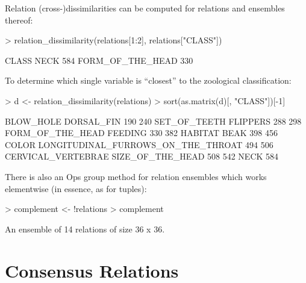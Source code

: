 \documentclass[fleqn]{article}
\newcommand{\dQuote}[1]{``{#1}''}
\begin{document}
Relation (cross-)dissimilarities can be computed for relations and
ensembles thereof:
\begin{Schunk}
\begin{Sinput}
> relation_dissimilarity(relations[1:2], relations["CLASS"])
\end{Sinput}
\begin{Soutput}
                 CLASS
NECK               584
FORM_OF_THE_HEAD   330
\end{Soutput}
\end{Schunk}
To determine which single variable is \dQuote{closest} to the zoological
classification:
\begin{Schunk}
\begin{Sinput}
> d <- relation_dissimilarity(relations)
> sort(as.matrix(d)[, "CLASS"])[-1]
\end{Sinput}
\begin{Soutput}
                         BLOW_HOLE                         DORSAL_FIN 
                               190                                240 
                      SET_OF_TEETH                           FLIPPERS 
                               288                                298 
                  FORM_OF_THE_HEAD                            FEEDING 
                               330                                382 
                           HABITAT                               BEAK 
                               398                                456 
                             COLOR LONGITUDINAL_FURROWS_ON_THE_THROAT 
                               494                                506 
                CERVICAL_VERTEBRAE                   SIZE_OF_THE_HEAD 
                               508                                542 
                              NECK 
                               584 
\end{Soutput}
\end{Schunk}

There is also an Ops group method for relation ensembles which works
elementwise (in essence, as for tuples):
\begin{Schunk}
\begin{Sinput}
> complement <- !relations
> complement
\end{Sinput}
\begin{Soutput}
An ensemble of 14 relations of size 36 x 36.
\end{Soutput}
\end{Schunk}

\section{Consensus Relations}
\label{sec:consensus}
\end{document}
